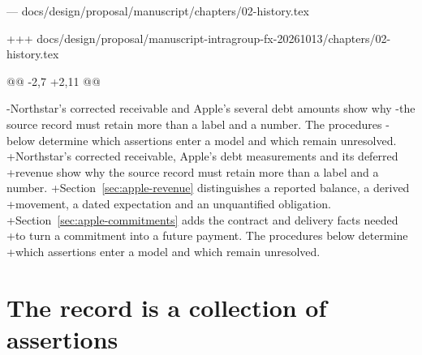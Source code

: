 --- docs/design/proposal/manuscript/chapters/02-history.tex

+++ docs/design/proposal/manuscript-intragroup-fx-20261013/chapters/02-history.tex

@@ -2,7 +2,11 @@

 \label{ch:history}
 
-Northstar's corrected receivable and Apple's several debt amounts show why
-the source record must retain more than a label and a number. The procedures
-below determine which assertions enter a model and which remain unresolved.
+Northstar's corrected receivable, Apple's debt measurements and its deferred
+revenue show why the source record must retain more than a label and a number.
+Section~\ref{sec:apple-revenue} distinguishes a reported balance, a derived
+movement, a dated expectation and an unquantified obligation.
+Section~\ref{sec:apple-commitments} adds the contract and delivery facts needed
+to turn a commitment into a future payment. The procedures below determine
+which assertions enter a model and which remain unresolved.
 
 \section{The record is a collection of assertions}

